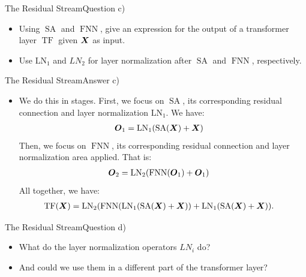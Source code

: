 \documentclass[t]{beamer}
\newcommand\op[1]{\operatorname{#1}}
\begin{document}
\begin{frame}{The Residual Stream}{Question c)}
    \begin{itemize}
        \item Using $\op{SA}$ and $\op{FNN}$, give an expression for the output
              of a transformer layer $\op{TF}$ given ${\boldsymbol{X}}$ as input.
        \item Use $\op{LN_1}$ and ${LN_2}$ for layer normalization after
              $\op{SA}$ and $\op{FNN}$, respectively.
    \end{itemize}
\end{frame}

\begin{frame}{The Residual Stream}{Answer c)}
    \begin{itemize}
        \item We do this in stages. First, we focus on $\op{SA}$, its
              corresponding residual connection and layer normalization
              $\op{LN_1}$.
              We have:
              \begin{align}
                  \op{\mO_1} & = \op{LN_1}(\op{SA}(\mX) + \mX)
              \end{align}
              Then, we focus on $\op{FNN}$, its corresponding residual
              connection and layer normalization area applied.
              That is:
              \begin{align}
                  \op{\mO_2} & = \op{LN_2}(\op{FNN}(\mO_1) + \mO_1)
              \end{align}
              All together, we have:
              \begin{align}
                  \op{TF}(\mX) & = \op{LN_2}(\op{FNN}(\op{LN_1}(\op{SA}(\mX) + \mX)) + \op{LN_1}(\op{SA}(\mX) + \mX)).
              \end{align}
    \end{itemize}
\end{frame}

\begin{frame}{The Residual Stream}{Question d)}
    \begin{itemize}
        \item What do the layer normalization operators $LN_i$ do?
        \item And could we use them in a different part of the transformer
              layer?
    \end{itemize}
\end{frame}
\end{document}
